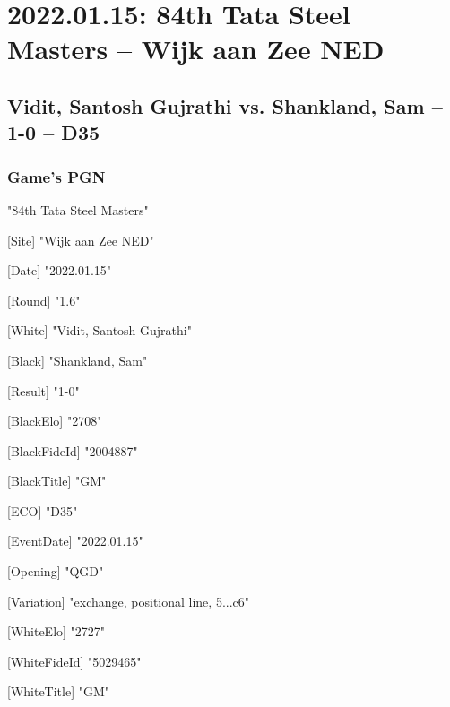 \documentclass[9pt]{extarticle}
\begin{document}
\setlength{\columnsep}{32pt}
\section*{2022.01.15: 84th Tata Steel Masters -- Wijk aan Zee NED}

\subsection*{Vidit, Santosh Gujrathi vs. Shankland, Sam -- 1-0 -- D35}
\subsubsection*{Game's PGN}
\begin{multicols}{2}
\begin{flushleft}
[Event] "84th Tata Steel Masters"

[Site] "Wijk aan Zee NED"

[Date] "2022.01.15"

[Round] "1.6"

[White] "Vidit, Santosh Gujrathi"

[Black] "Shankland, Sam"

[Result] "1-0"

[BlackElo] "2708"

[BlackFideId] "2004887"

[BlackTitle] "GM"

[ECO] "D35"

[EventDate] "2022.01.15"

[Opening] "QGD"

[Variation] "exchange, positional line, 5...c6"

[WhiteElo] "2727"

[WhiteFideId] "5029465"

[WhiteTitle] "GM"


\end{flushleft}
\end{multicols}
\end{document}
